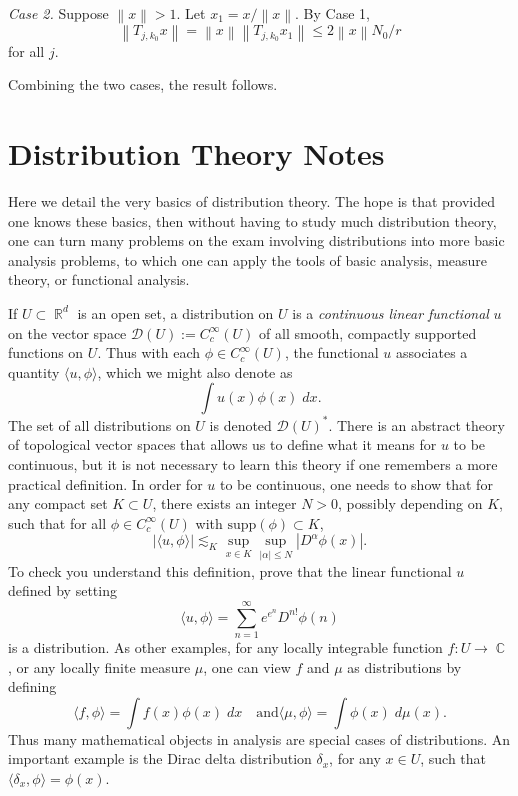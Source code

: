 \documentclass{exam}
\DeclareMathOperator{\CC}{\mathbb{C}}
\DeclareMathOperator{\RR}{\mathbb{R}}
\theoremstyle{problemstyle}
\newcommand{\norm}[1]{\left\lVert#1\right\rVert} %
\newcommand{\1}[1]{\textbf{1}_{\left[#1\right]}} %
\begin{document}
\begin{questions}
\begin{solution}
\textit{Case 2.} Suppose $\norm{x}>1$. Let $x_1 = x/\norm{x}$. By Case 1,
\begin{equation*}
\norm{T_{j,k_0} x} = \norm{x} \norm{T_{j,k_0}x_1} \leq 2\norm{x}N_0/r
\end{equation*}
for all $j$. 

Combining the two cases, the result follows.
\end{solution}







\newpage
\section{Distribution Theory Notes}

Here we detail the very basics of distribution theory. The hope is that provided one knows these basics, then without having to study much distribution theory, one can turn many problems on the exam involving distributions into more basic analysis problems, to which one can apply the tools of basic analysis, measure theory, or functional analysis.

If $U \subset \RR^d$ is an open set, a distribution on $U$ is a \emph{continuous linear functional} $u$ on the vector space $\mathcal{D}(U) := C_c^\infty(U)$ of all smooth, compactly supported functions on $U$. Thus with each $\phi \in C_c^\infty(U)$, the functional $u$ associates a quantity $\langle u, \phi \rangle$, which we might also denote as
%
\[ \int u(x) \phi(x)\; dx. \]
%
The set of all distributions on $U$ is denoted $\mathcal{D}(U)^*$. There is an abstract theory of topological vector spaces that allows us to define what it means for $u$ to be continuous, but it is not necessary to learn this theory if one remembers a more practical definition. In order for $u$ to be continuous, one needs to show that for any compact set $K \subset U$, there exists an integer $N > 0$, possibly depending on $K$, such that for all $\phi \in C_c^\infty(U)$ with $\text{supp}(\phi) \subset K$,
%
\[ |\langle u, \phi \rangle| \lesssim_K \sup_{x \in K} \sup_{|\alpha| \leq N} |D^\alpha \phi(x)|. \]
%
To check you understand this definition, prove that the linear functional $u$ defined by setting
%
\[ \langle u, \phi \rangle = \sum_{n = 1}^\infty e^{e^{n}} D^{n!} \phi(n) \]
%
is a distribution. As other examples, for any locally integrable function $f: U \to \CC$, or any locally finite measure $\mu$, one can view $f$ and $\mu$ as distributions by defining
%
\[ \langle f, \phi \rangle = \int f(x) \phi(x)\; dx \quad\text{and} \langle \mu, \phi \rangle = \int \phi(x)\; d\mu(x). \]
%
Thus many mathematical objects in analysis are special cases of distributions. An important example is the Dirac delta distribution $\delta_x$, for any $x \in U$, such that $\langle \delta_x, \phi \rangle = \phi(x)$.


\end{questions}
\end{document}
